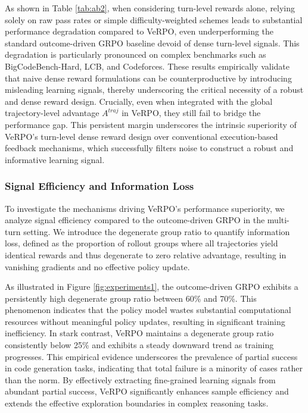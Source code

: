 \documentclass[11pt]{article}
\begin{document}
As shown in Table \ref{tab:ab2}, when considering turn-level rewards alone, relying solely on raw pass rates or simple difficulty-weighted schemes leads to substantial performance degradation compared to VeRPO, even underperforming the standard outcome-driven GRPO baseline devoid of dense turn-level signals. This degradation is particularly pronounced on complex benchmarks such as BigCodeBench-Hard, LCB, and Codeforces. These results empirically validate that naive dense reward formulations can be counterproductive by introducing misleading learning signals, thereby underscoring the critical necessity of a robust and dense reward design. Crucially, even when integrated with the global trajectory-level advantage $A^{traj}$ in VeRPO, they still fail to bridge the performance gap. This persistent margin underscores the intrinsic superiority of VeRPO’s turn-level dense reward design over conventional execution-based feedback mechanisms, which successfully filters noise to construct a robust and informative learning signal.

\subsubsection{Signal Efficiency and Information Loss}
To investigate the mechanisms driving VeRPO's performance superiority, we analyze signal efficiency compared to the outcome-driven GRPO in the multi-turn setting. We introduce the degenerate group ratio to quantify information loss, defined as the proportion of rollout groups where all trajectories yield identical rewards and thus degenerate to zero relative advantage, resulting in vanishing gradients and no effective policy update.

As illustrated in Figure \ref{fig:experiments1}, the outcome-driven GRPO exhibits a persistently high degenerate group ratio between 60\% and 70\%. This phenomenon indicates that the policy model wastes substantial computational resources without meaningful policy updates, resulting in significant training inefficiency. In stark contrast, VeRPO maintains a degenerate group ratio consistently below 25\% and exhibits a steady downward trend as training progresses. This empirical evidence underscores the prevalence of partial success in code generation tasks, indicating that total failure is a minority of cases rather than the norm. By effectively extracting fine-grained learning signals from abundant partial success, VeRPO significantly enhances sample efficiency and extends the effective exploration boundaries in complex reasoning tasks.
\end{document}
